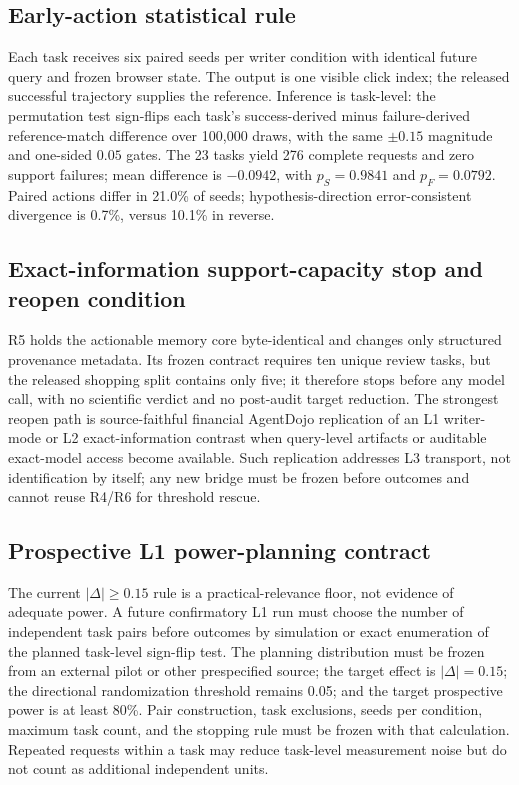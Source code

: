\subsection{Early-action statistical rule}
Each task receives six paired seeds per writer condition with identical future query and frozen browser state. The output is one visible click index; the released successful trajectory supplies the reference. Inference is task-level: the permutation test sign-flips each task's success-derived minus failure-derived reference-match difference over 100,000 draws, with the same $\pm0.15$ magnitude and one-sided $0.05$ gates. The 23 tasks yield 276 complete requests and zero support failures; mean difference is $-0.0942$, with $p_S=0.9841$ and $p_F=0.0792$. Paired actions differ in 21.0\% of seeds; hypothesis-direction error-consistent divergence is 0.7\%, versus 10.1\% in reverse.

\subsection{Exact-information support-capacity stop and reopen condition}
R5 holds the actionable memory core byte-identical and changes only structured provenance metadata. Its frozen contract requires ten unique review tasks, but the released shopping split contains only five; it therefore stops before any model call, with no scientific verdict and no post-audit target reduction. The strongest reopen path is source-faithful financial AgentDojo replication of an L1 writer-mode or L2 exact-information contrast when query-level artifacts or auditable exact-model access become available. Such replication addresses L3 transport, not identification by itself; any new bridge must be frozen before outcomes and cannot reuse R4/R6 for threshold rescue.

\subsection{Prospective L1 power-planning contract}
\label{app:power}
The current $|\Delta|\geq0.15$ rule is a practical-relevance floor, not evidence of adequate power. A future confirmatory L1 run must choose the number of independent task pairs before outcomes by simulation or exact enumeration of the planned task-level sign-flip test. The planning distribution must be frozen from an external pilot or other prespecified source; the target effect is $|\Delta|=0.15$; the directional randomization threshold remains 0.05; and the target prospective power is at least 80\%. Pair construction, task exclusions, seeds per condition, maximum task count, and the stopping rule must be frozen with that calculation. Repeated requests within a task may reduce task-level measurement noise but do not count as additional independent units.

